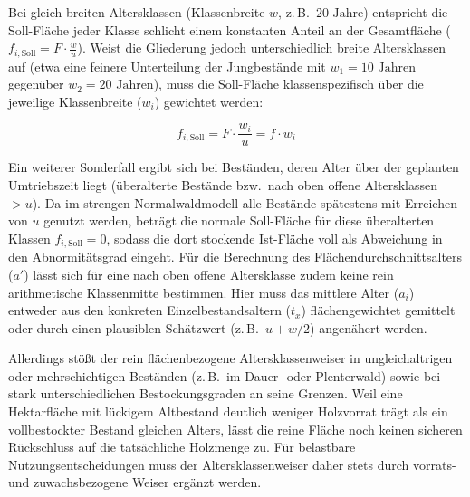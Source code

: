 \documentclass[twocolumn, paper=a4, fontsize=10pt]{scrartcl}
\begin{document}
Bei gleich breiten Altersklassen (Klassenbreite $w$, z.\,B.\ $20\text{ Jahre}$) entspricht die Soll-Fläche jeder Klasse schlicht einem konstanten Anteil an der Gesamtfläche ($f_{i,\text{Soll}} = F \cdot \frac{w}{u}$). Weist die Gliederung jedoch unterschiedlich breite Altersklassen auf (etwa eine feinere Unterteilung der Jungbestände mit $w_1 = 10\text{ Jahren}$ gegenüber $w_2 = 20\text{ Jahren}$), muss die Soll-Fläche klassenspezifisch über die jeweilige Klassenbreite ($w_i$) gewichtet werden:

\begin{equation}
    f_{i,\text{Soll}} = F \cdot \frac{w_i}{u} = f \cdot w_i
\end{equation}

Ein weiterer Sonderfall ergibt sich bei Beständen, deren Alter über der geplanten Umtriebszeit liegt (überalterte Bestände bzw.\ nach oben offene Altersklassen $> u$). Da im strengen Normalwaldmodell alle Bestände spätestens mit Erreichen von $u$ genutzt werden, beträgt die normale Soll-Fläche für diese überalterten Klassen $f_{i,\text{Soll}} = 0$, sodass die dort stockende Ist-Fläche voll als Abweichung in den Abnormitätsgrad eingeht. Für die Berechnung des Flächendurchschnittsalters ($a'$) lässt sich für eine nach oben offene Altersklasse zudem keine rein arithmetische Klassenmitte bestimmen. Hier muss das mittlere Alter ($a_i$) entweder aus den konkreten Einzelbestandsaltern ($t_x$) flächengewichtet gemittelt oder durch einen plausiblen Schätzwert (z.\,B.\ $u + w/2$) angenähert werden.

Allerdings stößt der rein flächenbezogene Altersklassenweiser in ungleichaltrigen oder mehrschichtigen Beständen (z.\,B.\ im Dauer- oder Plenterwald) sowie bei stark unterschiedlichen Bestockungsgraden an seine Grenzen. Weil eine Hektarfläche mit lückigem Altbestand deutlich weniger Holzvorrat trägt als ein vollbestockter Bestand gleichen Alters, lässt die reine Fläche noch keinen sicheren Rückschluss auf die tatsächliche Holzmenge zu. Für belastbare Nutzungsentscheidungen muss der Altersklassenweiser daher stets durch vorrats- und zuwachsbezogene Weiser ergänzt werden.
\end{document}
